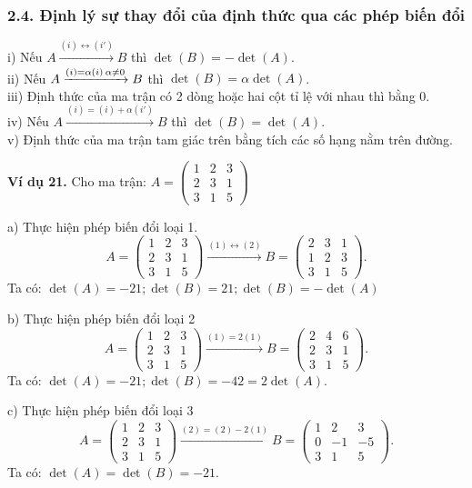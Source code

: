 \subsubsection*{2.4. Định lý sự thay đổi của định thức qua các phép biến đổi}
i) Nếu \(A \xrightarrow{(i) \leftrightarrow (i')} B\) thì \(\det(B) = -\det(A)\).\\
ii) Nếu \(A \xrightarrow{(i)=\alpha(i) \\ \alpha \neq 0} B\) thì \(\det(B) = \alpha \det(A)\).\\
iii) Định thức của ma trận có 2 dòng hoặc hai cột tỉ lệ với nhau thì bằng 0.\\
iv) Nếu \(A \xrightarrow{(i)=(i)+\alpha(i')} B\) thì \(\det(B) = \det(A)\).\\
v) Định thức của ma trận tam giác trên bằng tích các số hạng nằm trên đường.

\textbf{Ví dụ 21.} Cho ma trận: \(A = \begin{pmatrix}
1 & 2 & 3 \\
2 & 3 & 1 \\
3 & 1 & 5
\end{pmatrix} \)

a) Thực hiện phép biến đổi loại 1.
\[
A = \begin{pmatrix}
1 & 2 & 3 \\
2 & 3 & 1 \\
3 & 1 & 5
\end{pmatrix} \xrightarrow{(1) \leftrightarrow (2)} B = \begin{pmatrix}
2 & 3 & 1 \\
1 & 2 & 3 \\
3 & 1 & 5
\end{pmatrix}.
\]
Ta có: \(\det(A) = -21; \det(B) = 21; \det(B) = -\det(A)\)

b) Thực hiện phép biến đổi loại 2
\[
A = \begin{pmatrix}
1 & 2 & 3 \\
2 & 3 & 1 \\
3 & 1 & 5
\end{pmatrix} \xrightarrow{(1)=2(1)} B = \begin{pmatrix}
2 & 4 & 6 \\
2 & 3 & 1 \\
3 & 1 & 5
\end{pmatrix}.
\]
Ta có: \(\det(A) = -21; \det(B) = -42 = 2\det(A)\).

c) Thực hiện phép biến đổi loại 3
\[
A = \begin{pmatrix}
1 & 2 & 3 \\
2 & 3 & 1 \\
3 & 1 & 5
\end{pmatrix} \xrightarrow{(2)=(2)-2(1)} B = \begin{pmatrix}
1 & 2 & 3 \\
0 & -1 & -5 \\
3 & 1 & 5
\end{pmatrix}.
\]
Ta có: \(\det(A) = \det(B) = -21\).
